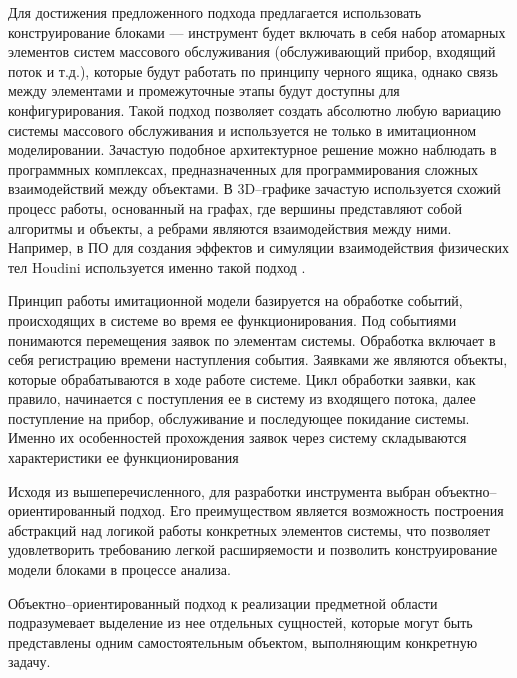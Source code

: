 Для достижения предложенного подхода предлагается использовать конструирование блоками \cite{valentin2002simulation} --- инструмент будет включать в себя набор атомарных элементов систем массового обслуживания (обслуживающий прибор, входящий поток и т.д.), которые будут работать по принципу черного ящика, однако связь между элементами и промежуточные этапы будут доступны для конфигурирования. Такой подход позволяет создать абсолютно любую вариацию системы массового обслуживания и используется не только в имитационном моделировании. Зачастую подобное архитектурное решение можно наблюдать в программных комплексах, предназначенных для программирования сложных взаимодействий между объектами. В 3D--графике зачастую используется схожий процесс работы, основанный на графах, где вершины представляют собой алгоритмы и объекты, а ребрами являются взаимодействия между ними. Например, в ПО для создания эффектов и симуляции взаимодействия физических тел Houdini используется именно такой подход \cite{claes2009controlling}.

Принцип работы имитационной модели базируется на обработке событий, происходящих в системе во время ее функционирования. Под событиями понимаются перемещения заявок по элементам системы. Обработка включает в себя регистрацию времени наступления события. Заявками же являются объекты, которые обрабатываются в ходе работе системе. Цикл обработки заявки, как правило, начинается с поступления ее в систему из входящего потока, далее поступление на прибор, обслуживание и последующее покидание системы. Именно их особенностей прохождения заявок через систему складываются характеристики ее функционирования

Исходя из вышеперечисленного, для разработки инструмента выбран объектно--ориентированный подход. Его преимуществом является возможность построения абстракций над логикой работы конкретных элементов системы, что позволяет удовлетворить требованию легкой расширяемости и позволить конструирование модели блоками в процессе анализа. 

Объектно--ориентированный подход \cite{fowler1997analysis} к реализации предметной области подразумевает выделение из нее отдельных сущностей, которые могут быть представлены одним самостоятельным объектом, выполняющим конкретную задачу.

